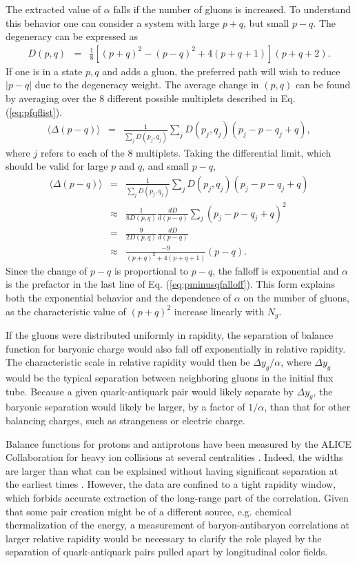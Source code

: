 \documentclass[aps, prc, 12pt, nofootinbib, showpacs, superscriptaddress, tightenlines, groupedaddress]{revtex4-2}
\begin{document}
The extracted value of $\alpha$ falls if the number of gluons is increased. To understand this behavior one can consider a system with large $p+q$, but small $p-q$. The degeneracy can be expressed as
\begin{eqnarray}
D(p,q)&=&\frac{1}{8}\left[(p+q)^2-(p-q)^2+4(p+q+1)\right](p+q+2).
\end{eqnarray}
If one is in a state $p,q$ and adds a gluon, the preferred path will wish to reduce $|p-q|$ due to the degeneracy weight. The average change in $(p,q)$ can be found by averaging over the 8 different possible multiplets described in Eq. (\ref{eq:pfqflist}). 
\begin{eqnarray}
\langle \Delta(p-q)\rangle &=&\frac{1}{\sum_jD(p_j,q_j)}\sum_jD(p_j,q_j)(p_j-p-q_j+q),
\end{eqnarray}
where $j$ refers to each of the 8 multiplets. Taking the differential limit, which should be valid for large $p$ and $q$, and small $p-q$, 
\begin{eqnarray}\label{eq:pminusqfalloff}
\langle \Delta(p-q)\rangle &=&\frac{1}{\sum_jD(p_j,q_j)}\sum_jD(p_j,q_j)(p_j-p-q_j+q)\\
\nonumber
&\approx&\frac{1}{8D(p,q)}\frac{dD}{d(p-q)}\sum_j (p_j-p-q_j+q)^2\\
\nonumber
&=&\frac{9}{2D(p,q)}\frac{dD}{d(p-q)}\\
\nonumber
&\approx&\frac{-9}{(p+q)^2+4(p+q+1)}(p-q).
\end{eqnarray}
Since the change of $p-q$ is proportional to $p-q$, the falloff is exponential and $\alpha$ is the prefactor in the last line of Eq. (\ref{eq:pminusqfalloff}). This form explains both the exponential behavior and the dependence of $\alpha$ on the number of gluons, as the characteristic value of $(p+q)^2$ increase linearly with $N_g$.

If the gluons were distributed uniformly in rapidity, the separation of balance function for baryonic charge would also fall off exponentially in relative rapidity. The characteristic scale in relative rapidity would then be $\Delta y_g/\alpha$, where $\Delta y_g$ would be the typical separation between neighboring gluons in the initial flux tube. Because a given quark-antiquark pair would likely separate by $\Delta y_g$, the baryonic separation would likely be larger, by a factor of $1/\alpha$, than that for other balancing charges, such as strangeness or electric charge.

Balance functions for protons and antiprotons have been measured by the ALICE Collaboration for heavy ion collisions at several centralities \cite{ALICE:2021hjb}. Indeed, the widths are larger than what can be explained without having significant separation at the earliest times \cite{Pratt:2021xvg}. However, the data are confined to a tight rapidity window, which forbids accurate extraction of the long-range part of the correlation. Given that some pair creation might be of a different source, e.g. chemical thermalization of the energy, a measurement of baryon-antibaryon correlations at larger relative rapidity would be necessary to clarify the role played by the separation of quark-antiquark pairs pulled apart by longitudinal color fields. 
\end{document}
